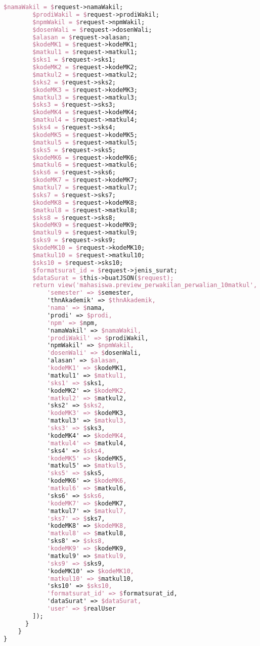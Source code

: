 \begin{lstlisting}[language=tex,basicstyle=\tiny,caption=PesanansuratController.php]
        $namaWakil = $request->namaWakil;
        $prodiWakil = $request->prodiWakil;
        $npmWakil = $request->npmWakil;
        $dosenWali = $request->dosenWali;
        $alasan = $request->alasan;
        $kodeMK1 = $request->kodeMK1;
        $matkul1 = $request->matkul1;
        $sks1 = $request->sks1;
        $kodeMK2 = $request->kodeMK2;
        $matkul2 = $request->matkul2;
        $sks2 = $request->sks2;
        $kodeMK3 = $request->kodeMK3;
        $matkul3 = $request->matkul3;
        $sks3 = $request->sks3;
        $kodeMK4 = $request->kodeMK4;
        $matkul4 = $request->matkul4;
        $sks4 = $request->sks4;
        $kodeMK5 = $request->kodeMK5;
        $matkul5 = $request->matkul5;
        $sks5 = $request->sks5;
        $kodeMK6 = $request->kodeMK6;
        $matkul6 = $request->matkul6;
        $sks6 = $request->sks6;
        $kodeMK7 = $request->kodeMK7;
        $matkul7 = $request->matkul7;
        $sks7 = $request->sks7;
        $kodeMK8 = $request->kodeMK8;
        $matkul8 = $request->matkul8;
        $sks8 = $request->sks8;
        $kodeMK9 = $request->kodeMK9;
        $matkul9 = $request->matkul9;
        $sks9 = $request->sks9;
        $kodeMK10 = $request->kodeMK10;
        $matkul10 = $request->matkul10;
        $sks10 = $request->sks10;
        $formatsurat_id = $request->jenis_surat;
        $dataSurat = $this->buatJSON($request);
        return view('mahasiswa.preview_perwakilan_perwalian_10matkul', [
            'semester' => $semester,
            'thnAkademik' => $thnAkademik,
            'nama' => $nama,
            'prodi' => $prodi,
            'npm' => $npm,
            'namaWakil' => $namaWakil,
            'prodiWakil' => $prodiWakil,
            'npmWakil' => $npmWakil,
            'dosenWali' => $dosenWali,
            'alasan' => $alasan,
            'kodeMK1' => $kodeMK1,
            'matkul1' => $matkul1,
            'sks1' => $sks1,
            'kodeMK2' => $kodeMK2,
            'matkul2' => $matkul2,
            'sks2' => $sks2,
            'kodeMK3' => $kodeMK3,
            'matkul3' => $matkul3,
            'sks3' => $sks3,
            'kodeMK4' => $kodeMK4,
            'matkul4' => $matkul4,
            'sks4' => $sks4,
            'kodeMK5' => $kodeMK5,
            'matkul5' => $matkul5,
            'sks5' => $sks5,
            'kodeMK6' => $kodeMK6,
            'matkul6' => $matkul6,
            'sks6' => $sks6,
            'kodeMK7' => $kodeMK7,
            'matkul7' => $matkul7,
            'sks7' => $sks7,
            'kodeMK8' => $kodeMK8,
            'matkul8' => $matkul8,
            'sks8' => $sks8,
            'kodeMK9' => $kodeMK9,
            'matkul9' => $matkul9,
            'sks9' => $sks9,
            'kodeMK10' => $kodeMK10,
            'matkul10' => $matkul10,
            'sks10' => $sks10,
            'formatsurat_id' => $formatsurat_id,
            'dataSurat' => $dataSurat,
            'user' => $realUser
        ]);
      }
    }
}
\end{lstlisting}

